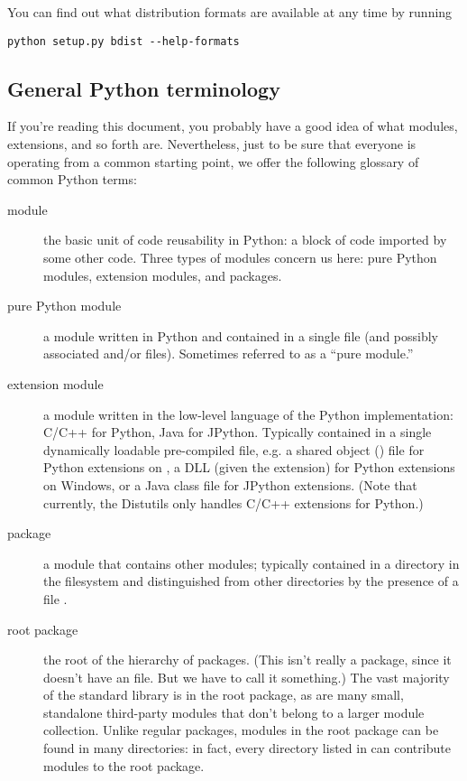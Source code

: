 \documentclass{howto}
\begin{document}
You can find out what distribution formats are available at any time by
running
\begin{verbatim}
python setup.py bdist --help-formats
\end{verbatim}


\subsection{General Python terminology}
\label{python-terms}

If you're reading this document, you probably have a good idea of what
modules, extensions, and so forth are.  Nevertheless, just to be sure
that everyone is operating from a common starting point, we offer the
following glossary of common Python terms:
\begin{description}
\item[module] the basic unit of code reusability in Python: a block of
  code imported by some other code.  Three types of modules concern us
  here: pure Python modules, extension modules, and packages.
\item[pure Python module] a module written in Python and contained in a
  single  file (and possibly associated  and/or
   files).  Sometimes referred to as a ``pure module.''
\item[extension module] a module written in the low-level language of
  the Python implementation: C/C++ for Python, Java for JPython.
  Typically contained in a single dynamically loadable pre-compiled
  file, e.g. a shared object () file for Python extensions on
  \UNIX, a DLL (given the  extension) for Python extensions
  on Windows, or a Java class file for JPython extensions.  (Note that
  currently, the Distutils only handles C/C++ extensions for Python.)
\item[package] a module that contains other modules; typically contained
  in a directory in the filesystem and distinguished from other
  directories by the presence of a file .
\item[root package] the root of the hierarchy of packages.  (This isn't
  really a package, since it doesn't have an 
  file.  But we have to call it something.)  The vast majority of the
  standard library is in the root package, as are many small, standalone
  third-party modules that don't belong to a larger module collection.
  Unlike regular packages, modules in the root package can be found in
  many directories: in fact, every directory listed in 
  can contribute modules to the root package.
\end{description}
\end{document}
